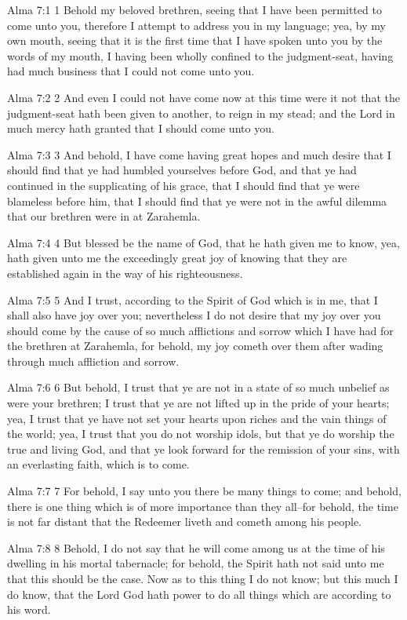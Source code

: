 Alma 7:1
 1 Behold my beloved brethren, seeing that I have been permitted
to come unto you, therefore I attempt to address you in my
language; yea, by my own mouth, seeing that it is the first time
that I have spoken unto you by the words of my mouth, I having
been wholly confined to the judgment-seat, having had much
business that I could not come unto you.

Alma 7:2
 2 And even I could not have come now at this time were it not
that the judgment-seat hath been given to another, to reign in my
stead; and the Lord in much mercy hath granted that I should come
unto you.

Alma 7:3
 3 And behold, I have come having great hopes and much desire
that I should find that ye had humbled yourselves before God, and
that ye had continued in the supplicating of his grace, that I
should find that ye were blameless before him, that I should find
that ye were not in the awful dilemma that our brethren were in
at Zarahemla.

Alma 7:4
 4 But blessed be the name of God, that he hath given me to know,
yea, hath given unto me the exceedingly great joy of knowing that
they are established again in the way of his righteousness.

Alma 7:5
 5 And I trust, according to the Spirit of God which is in me,
that I shall also have joy over you; nevertheless I do not desire
that my joy over you should come by the cause of so much
afflictions and sorrow which I have had for the brethren at
Zarahemla, for behold, my joy cometh over them after wading
through much affliction and sorrow.

Alma 7:6
 6 But behold, I trust that ye are not in a state of so much
unbelief as were your brethren; I trust that ye are not lifted up
in the pride of your hearts; yea, I trust that ye have not set
your hearts upon riches and the vain things of the world; yea, I
trust that you do not worship idols, but that ye do worship the
true and living God, and that ye look forward for the remission
of your sins, with an everlasting faith, which is to come.

Alma 7:7
 7 For behold, I say unto you there be many things to come; and
behold, there is one thing which is of more importance than they
all--for behold, the time is not far distant that the Redeemer
liveth and cometh among his people.

Alma 7:8
 8 Behold, I do not say that he will come among us at the time of
his dwelling in his mortal tabernacle; for behold, the Spirit
hath not said unto me that this should be the case. Now as to
this thing I do not know; but this much I do know, that the Lord
God hath power to do all things which are according to his word.

